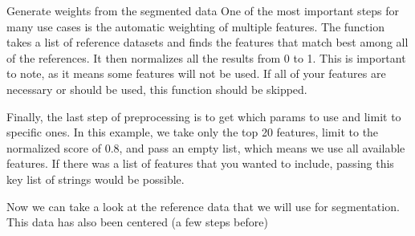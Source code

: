 \documentclass[letterpaper,10pt,english]{sphinxmanual}
\begin{document}
\begin{sphinxVerbatim}[commandchars=\\\{\}]
    
\end{sphinxVerbatim}

\sphinxAtStartPar
Generate weights from the segmented data
One of the most important steps for many use cases is the automatic weighting of multiple features.
The  function takes a list of reference datasets and finds the features that match
best among all of the references.  It then normalizes all the results from 0 to 1. 
This is important to note, as it means some features will not be used. 
If all of your features are necessary or should be used, this function should be skipped.

\begin{sphinxVerbatim}[commandchars=\\\{\}]
  
\end{sphinxVerbatim}

\sphinxAtStartPar
Finally, the last step of pre\sphinxhyphen{}processing is to get which params to use and limit to specific ones. 
In this example, we take only the top 20 features, limit to the normalized score of 0.8, and pass
an empty list, which means we use all available features.  If there was a list of features
that you wanted to include, passing this key list of strings would be possible.

\begin{sphinxVerbatim}[commandchars=\\\{\}]
     \PYG{p}{[}\PYG{p}{]}
\end{sphinxVerbatim}

\sphinxAtStartPar
Now we can take a look at the reference data that we will use for segmentation. 
This data has also been centered (a few steps before)
\end{document}
